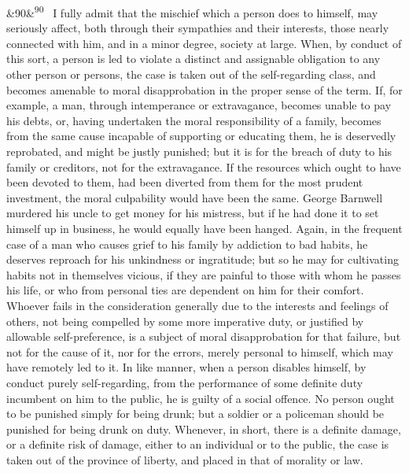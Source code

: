 \documentclass[12pt]{article}
\newcommand{\para}[1][]{\par\noindent\ifx&#1&\else\textsuperscript{\footnotesize #1}~\fi}
\begin{document}
\para[90] I fully admit that the mischief which a person does to himself, may seriously affect, both through their sympathies and their interests, those nearly connected with him, and in a minor degree, society at large. When, by conduct of this sort, a person is led to violate a distinct and assignable obligation to any other person or persons, the case is taken out of the self-regarding class, and becomes amenable to moral disapprobation in the proper sense of the term. If, for example, a man, through intemperance or extravagance, becomes unable to pay his debts, or, having undertaken the moral responsibility of a family, becomes from the same cause incapable of supporting or educating them, he is deservedly reprobated, and might be justly punished; but it is for the breach of duty to his family or creditors, not for the extravagance. If the resources which ought to have been devoted to them, had been diverted from them for the most prudent investment, the moral culpability would have been the same. George Barnwell murdered his uncle to get money for his mistress, but if he had done it to set himself up in business, he would equally have been hanged. Again, in the frequent case of a man who causes grief to his family by addiction to bad habits, he deserves reproach for his unkindness or ingratitude; but so he may for cultivating habits not in themselves vicious, if they are painful to those with whom he passes his life, or who from personal ties are dependent on him for their comfort. Whoever fails in the consideration generally due to the interests and feelings of others, not being compelled by some more imperative duty, or justified by allowable self-preference, is a subject of moral disapprobation for that failure, but not for the cause of it, nor for the errors, merely personal to himself, which may have remotely led to it. In like manner, when a person disables himself, by conduct purely self-regarding, from the performance of some definite duty incumbent on him to the public, he is guilty of a social offence. No person ought to be punished simply for being drunk; but a soldier or a policeman should be punished for being drunk on duty. Whenever, in short, there is a definite damage, or a definite risk of damage, either to an individual or to the public, the case is taken out of the province of liberty, and placed in that of morality or law.
\end{document}

